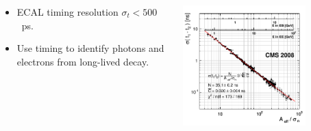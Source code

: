 \documentclass{beamer}
\begin{document}
\begin{frame}
\begin{minipage}{0.8\paperwidth}
\begin{itemize}
  \begin{columns}
    \begin{column}{0.5\textwidth} 
           \begin{itemize}
             \item ECAL timing resolution $\sigma_{t} < 500$~ps.
             \item Use timing to identify photons and electrons from long-lived decay.
           \end{itemize}
     \end{column}%
     \begin{column}{0.6\textwidth}
       \includegraphics[width=0.75\textwidth]{THESISPLOTS/ECAL_Timing_Resolution.png}        
     \end{column} 
   \end{columns} 
     
  \end{itemize}
\end{minipage}
\end{frame}
\end{document}

